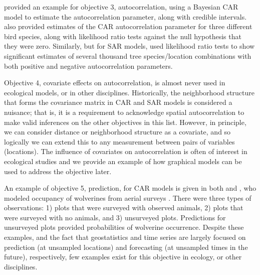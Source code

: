 \documentclass[11pt, titlepage]{article}\usepackage[]{graphicx}\usepackage[]{color}
\begin{document}
\begin{spacing}{1.9}
\begin{flushleft}
\citet{Gard:Lawl:Ver:Mago:Kell:coar:2010} provided an example for objective 3, autocorrelation, using a Bayesian CAR model to estimate the autocorrelation parameter, along with credible intervals. \citet{Lich:Simo:Shri:Fran:spat:2002} also provided estimates of the CAR autocorrelation parameter for three different bird species, along with likelihood ratio tests against the null hypothesis that they were zero.  Similarly, but for SAR models, \citet{Bull:Burk:eval:2005} used likelihood ratio tests to show significant estimates of several thousand tree species/location combinations with both positive and negative autocorrelation parameters.

Objective 4, covariate effects on autocorrelation, is almost never used in ecological models, or in other disciplines. Historically, the neighborhood structure that forms the covariance matrix in CAR and SAR models is considered a nuisance; that is, it is a requirement to acknowledge spatial autocorrelation to make valid inferences on the other objectives in this list. However, in principle, we can consider distance or neighborhood structure as a covariate, and so logically we can extend this to any measurement between pairs of variables (locations). The influence of covariates on autocorrelation is often of interest in ecological studies \citep{Hank:Hoot:circ:2013} and we provide an example of how graphical models can be used to address the objective later. 

An example of objective 5, prediction, for CAR models is given in both \citet{Mago:Ray:John:Valk:Daws:Bowm:mode:2007} and \citet{Gard:Lawl:Ver:Mago:Kell:coar:2010}, who modeled occupancy of wolverines from aerial surveys \citep[also see][]{John:Conn:Hoot:Ray:Pond:spat:2013}. There were three types of observations: 1) plots that were surveyed with observed animals, 2) plots that were surveyed with no animals, and 3) unsurveyed plots.  Predictions for unsurveyed plots provided probabilities of wolverine occurrence. Despite these examples, and the fact that geostatistics and time series are largely focused on prediction (at unsampled locations) and forecasting (at unsampled times in the future), respectively, few examples exist for this objective in ecology, or other disciplines.


\end{flushleft}
\end{spacing}
\end{document}
